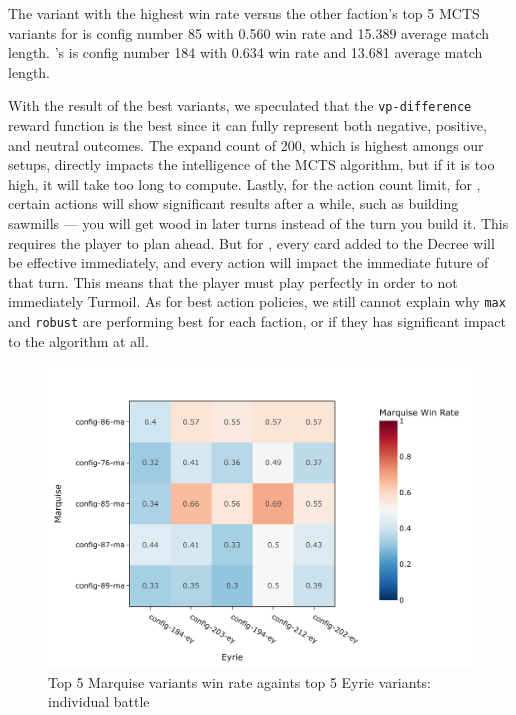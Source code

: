The variant with the highest win rate versus the other faction's top 5 MCTS variants for \Marquise{} is config number 85 with 0.560 win rate and 15.389 average match length. \Eyrie{}'s is config number 184 with 0.634 win rate and 13.681 average match length.

With the result of the best variants, we speculated that the \texttt{vp-difference} reward function is the best since it can fully represent both negative, positive, and neutral outcomes. The expand count of 200, which is highest amongs our setups, directly impacts the intelligence of the MCTS algorithm, but if it is too high, it will take too long to compute. Lastly, for the action count limit, for \Marquise{}, certain actions will show significant results after a while, such as building sawmills — you will get wood in later turns instead of the turn you build it. This requires the \Marquise{} player to plan ahead. But for \Eyrie{}, every card added to the Decree will be effective immediately, and every action will impact the immediate future of that turn. This means that the \Eyrie{} player must play perfectly in order to not immediately Turmoil. As for best action policies, we still cannot explain why \texttt{max} and \texttt{robust} are performing best for each faction, or if they has significant impact to the algorithm at all.

\begin{figure}[h!]
    \begin{center}
      \includegraphics[width=\textwidth]{./images/fig-stage-2-marquise-win-rate.jpeg}
    \end{center}
    \caption{Top 5 Marquise variants win rate againts top 5 Eyrie variants: individual battle}
    \label{fig:top-5-ma-wr-against-top-5-ey}
\end{figure}


